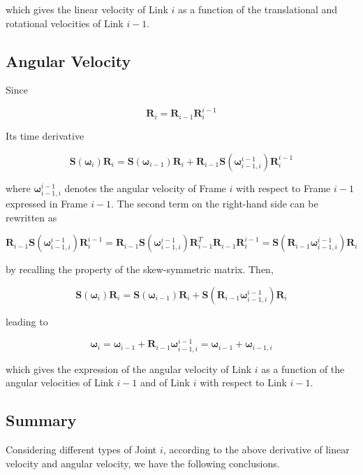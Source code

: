 \documentclass[10pt]{article}
\begin{document}
which gives the linear velocity of Link $i$ as a function of the translational and rotational velocities of Link $i-1$.

\subsection{Angular Velocity}

Since

$$
\boldsymbol{R}_{i}=\boldsymbol{R}_{i-1} \boldsymbol{R}_{i}^{i-1}
$$

Its time derivative

$$
\boldsymbol{S}\left(\boldsymbol{\omega}_{i}\right) \boldsymbol{R}_{i}=\boldsymbol{S}\left(\boldsymbol{\omega}_{i-1}\right) \boldsymbol{R}_{i}+\boldsymbol{R}_{i-1} \boldsymbol{S}\left(\boldsymbol{\omega}_{i-1, i}^{i-1}\right) \boldsymbol{R}_{i}^{i-1}
$$

where $\boldsymbol{\omega}_{i-1, i}^{i-1}$ denotes the angular velocity of Frame $i$ with respect to Frame $i-1$ expressed in Frame $i-1$. The second term on the right-hand side  can be rewritten as

$$
   \boldsymbol{R}_{i-1} \boldsymbol{S}\left(\boldsymbol{\omega}_{i-1, i}^{i-1}\right) \boldsymbol{R}_{i}^{i-1}=\boldsymbol{R}_{i-1} \boldsymbol{S}\left(\boldsymbol{\omega}_{i-1, i}^{i-1}\right) \boldsymbol{R}_{i-1}^{T} \boldsymbol{R}_{i-1} \boldsymbol{R}_{i}^{i-1}=\boldsymbol{S}\left(\boldsymbol{R}_{i-1} \boldsymbol{\omega}_{i-1, i}^{i-1}\right) \boldsymbol{R}_{i}
   $$

   
by recalling the property of the skew-symmetric matrix. Then,

$$
\boldsymbol{S}\left(\boldsymbol{\omega}_{i}\right) \boldsymbol{R}_{i}=\boldsymbol{S}\left(\boldsymbol{\omega}_{i-1}\right) \boldsymbol{R}_{i}+\boldsymbol{S}\left(\boldsymbol{R}_{i-1} \boldsymbol{\omega}_{i-1, i}^{i-1}\right) \boldsymbol{R}_{i}
$$

leading to 

$$
    \boldsymbol{\omega}_{i}=\boldsymbol{\omega}_{i-1}+\boldsymbol{R}_{i-1} \boldsymbol{\omega}_{i-1, i}^{i-1}=\boldsymbol{\omega}_{i-1}+\boldsymbol{\omega}_{i-1, i}
    $$

which gives the expression of the angular velocity of Link $i$ as a function of the angular velocities of Link $i-1$ and of Link $i$ with respect to Link $i-1$.



\subsection{Summary}
Considering different types of Joint $i$, according to the above derivative of linear velocity and angular velocity, we have the following conclusions.
\end{document}
